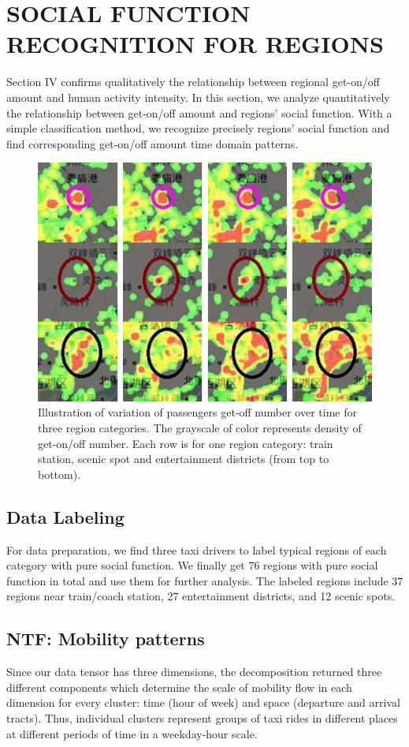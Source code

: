 \documentclass[a4paper, 10pt, conference]{ieeeconf}      %
\begin{document}
\section{SOCIAL FUNCTION RECOGNITION FOR REGIONS}%
Section IV confirms qualitatively the relationship between regional get-on/off amount and human activity intensity. In this section, we analyze quantitatively the relationship between get-on/off amount and regions’ social function. With a simple classification method, we recognize precisely regions’ social function and find corresponding get-on/off amount time domain patterns.
\begin{figure}[htpb]
    \centering
    \includegraphics{fig/f2.png}
    \caption{Illustration of variation of passengers get-off number over time for three region categories. The grayscale of color represents density of get-on/off number. Each row is for one region category: train station, scenic spot and entertainment districts (from top to bottom).}
    \label{fig:my_label_2}
\end{figure}
\subsection{Data Labeling} For data preparation, we find three taxi drivers to label typical regions of each category with pure social function. We finally get 76 regions with pure social function in total and use them for further analysis. The labeled regions include 37 regions near train/coach station, 27 entertainment districts, and 12 scenic spots.

\subsection{NTF: Mobility patterns}Since our data tensor has three dimensions, the decomposition returned three different components which determine the scale of mobility flow in each dimension for every cluster: time (hour of week) and space (departure and arrival tracts). Thus, individual clusters represent groups of taxi rides in different places at different periods of time in a weekday-hour scale.
\end{document}

